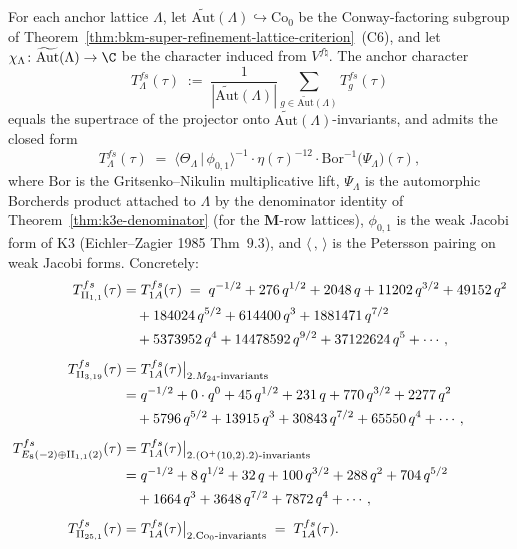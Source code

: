 \begin{theorem}
\label{thm:bkm-anchor-character}
For each anchor lattice $\Lambda$, let
$\widetilde{\mathrm{Aut}}(\Lambda)\hookrightarrow\mathrm{Co}_0$ be the
Conway-factoring subgroup of
Theorem~\ref{thm:bkm-super-refinement-lattice-criterion}~(C6), and let
$\chi_\Lambda\colon\widetilde{\mathrm{Aut}}(\Lambda)\to\C$ be the
character induced from $V^{f\natural}$. The anchor character
\[
 T^{fs}_\Lambda(\tau)
 \;:=\;
 \frac{1}{|\widetilde{\mathrm{Aut}}(\Lambda)|}
 \sum_{g\in\widetilde{\mathrm{Aut}}(\Lambda)} T^{fs}_g(\tau)
\]
equals the supertrace of the projector onto $\widetilde{\mathrm{Aut}}(\Lambda)$-invariants, and admits the closed
form
\[
 T^{fs}_\Lambda(\tau)
 \;=\;
 \bigl\langle \Theta_\Lambda \,|\, \phi_{0,1} \bigr\rangle^{-1}
 \cdot
 \eta(\tau)^{-12}
 \cdot
 \mathrm{Bor}^{-1}\bigl(\Psi_\Lambda\bigr)(\tau),
\]
where $\mathrm{Bor}$ is the Gritsenko--Nikulin multiplicative lift,
$\Psi_\Lambda$ is the automorphic Borcherds product attached to
$\Lambda$ by the denominator identity of
Theorem~\ref{thm:k3e-denominator} \textup{(}for the $\mathbf{M}$-row
lattices\textup{)}, $\phi_{0,1}$ is the weak Jacobi form of
K3 \textup{(}Eichler--Zagier 1985 Thm~$9.3$\textup{)}, and
$\langle\,,\,\rangle$ is the Petersson pairing on weak Jacobi forms.
Concretely:
\begin{align}
 T^{fs}_{\mathrm{II}_{1,1}}(\tau)
 &= T^{fs}_{1A}(\tau) \;=\;
 q^{-1/2} + 276\, q^{1/2} + 2048\, q + 11202\, q^{3/2}
 + 49152\, q^{2}
 \notag \\
 &\quad + 184024\, q^{5/2} + 614400\, q^{3} + 1881471\, q^{7/2}
 \notag \\
 &\quad + 5373952\, q^{4} + 14478592\, q^{9/2}
 + 37122624\, q^{5} + \cdots,
 \label{eq:bkm-T-fs-II11}
\\[4pt]
 T^{fs}_{\mathrm{II}_{3,19}}(\tau)
 &= T^{fs}_{1A}(\tau)\big|_{2.M_{24}\text{-invariants}}
 \notag \\
 &= q^{-1/2} + 0\cdot q^{0} + 45\, q^{1/2} + 231\, q + 770\, q^{3/2}
 + 2277\, q^{2}
 \notag \\
 &\quad + 5796\, q^{5/2} + 13915\, q^{3} + 30843\, q^{7/2}
 + 65550\, q^{4} + \cdots,
 \label{eq:bkm-T-fs-II319}
\\[4pt]
 T^{fs}_{E_8(-2)\oplus\mathrm{II}_{1,1}(2)}(\tau)
 &= T^{fs}_{1A}(\tau)\big|_{2.(\mathrm{O}^+(10,2).2)\text{-invariants}}
 \notag \\
 &= q^{-1/2} + 8\, q^{1/2} + 32\, q + 100\, q^{3/2}
 + 288\, q^{2} + 704\, q^{5/2}
 \notag \\
 &\quad + 1664\, q^{3} + 3648\, q^{7/2} + 7872\, q^{4} + \cdots,
 \label{eq:bkm-T-fs-En}
\\[4pt]
 T^{fs}_{\mathrm{II}_{25,1}}(\tau)
 &= T^{fs}_{1A}(\tau)\big|_{2.\mathrm{Co}_0\text{-invariants}}
 \;=\; T^{fs}_{1A}(\tau).
 \label{eq:bkm-T-fs-II251}
\end{align}
\end{theorem}

